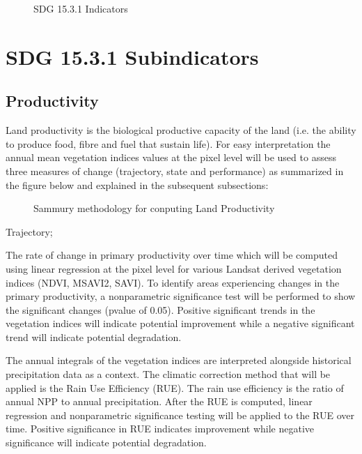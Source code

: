 \documentclass[letterpaper,10pt,english]{sphinxmanual}
\let\sphinxpxdimen\pdfpxdimen\else\newdimen\sphinxpxdimen
\begin{document}
\begin{figure}[H]
\centering
\capstart

\noindent\sphinxincludegraphics[width=500\sphinxpxdimen,height=300\sphinxpxdimen]{{sdg}.png}
\caption{SDG 15.3.1 Indicators}\label{\detokenize{Background/SDG_indicators:id1}}\end{figure}


\section{SDG 15.3.1 Sub\sphinxhyphen{}indicators}
\label{\detokenize{Background/SDG_indicators:sdg-15-3-1-sub-indicators}}

\subsection{Productivity}
\label{\detokenize{Background/SDG_indicators:productivity}}
\sphinxAtStartPar
Land productivity is the biological productive capacity of the land (i.e. the ability to produce food, fibre and fuel that sustain life). For easy interpretation the annual mean vegetation indices values at the pixel level will be used to assess three measures of change (trajectory, state and performance) as summarized in the figure below and explained in the subsequent sub\sphinxhyphen{}sections:

\begin{figure}[H]
\centering
\capstart

\noindent\sphinxincludegraphics[width=700\sphinxpxdimen,height=500\sphinxpxdimen]{{sdgmethodology}.png}
\caption{Sammury methodology for conputing Land Productivity}\label{\detokenize{Background/SDG_indicators:id2}}\end{figure}

\sphinxAtStartPar
Trajectory;

\sphinxAtStartPar
The rate of change in primary productivity over time which will be computed using linear regression at the pixel level for various Landsat derived vegetation indices (NDVI, MSAVI2, SAVI). To identify areas experiencing changes in the primary productivity, a non\sphinxhyphen{}parametric significance test will be performed to show the significant changes (p\sphinxhyphen{}value of 0.05). Positive significant trends in the vegetation indices will indicate potential improvement while a negative significant trend will indicate potential degradation.

\sphinxAtStartPar
The annual integrals of the vegetation indices are interpreted alongside historical precipitation data as a context. The climatic correction method that will be applied is the Rain Use Efficiency (RUE). The rain use efficiency is the ratio of annual NPP to annual precipitation. After the RUE is computed, linear regression and nonparametric significance testing will be applied to the RUE over time. Positive significance in RUE indicates improvement while negative significance will indicate potential degradation.
\end{document}
